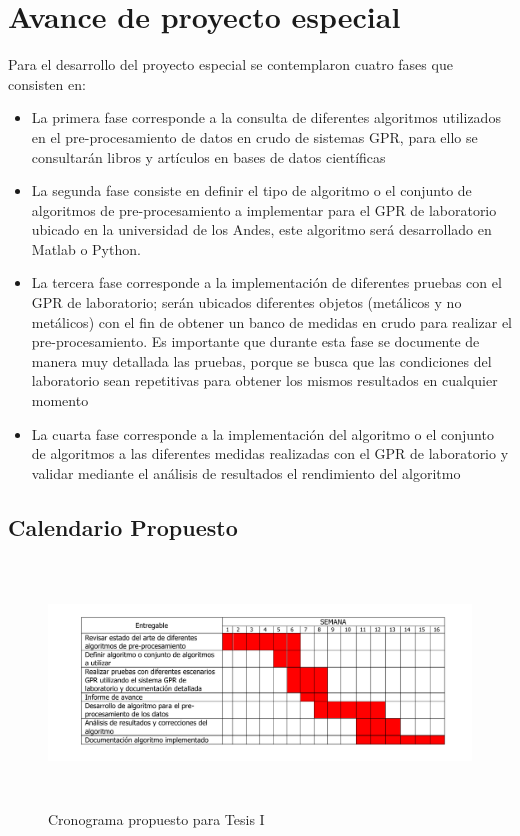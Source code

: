 \section{Avance de proyecto especial}

Para el desarrollo del proyecto especial se contemplaron cuatro fases que consisten en:

\begin{itemize}
\item La primera fase corresponde a la consulta de diferentes algoritmos utilizados en el pre-procesamiento de datos en crudo de sistemas GPR, para ello se consultarán libros y artículos en bases de datos científicas
\item La segunda fase consiste en definir el tipo de algoritmo o el conjunto de algoritmos de pre-procesamiento a implementar para el GPR de laboratorio ubicado en la universidad de los Andes, este algoritmo será desarrollado en Matlab o Python.
\item La tercera fase corresponde a la implementación de diferentes pruebas con el GPR de laboratorio; serán ubicados diferentes objetos (metálicos y no metálicos) con el fin de obtener un banco de medidas en crudo para realizar el pre-procesamiento. Es importante que durante esta fase se documente de manera muy detallada las pruebas, porque se busca que las condiciones del laboratorio sean repetitivas para obtener los mismos resultados en cualquier momento
\item La cuarta fase corresponde a la implementación del algoritmo o el conjunto de algoritmos a las diferentes medidas realizadas con el GPR de laboratorio y validar mediante el análisis de resultados el rendimiento del algoritmo
\end{itemize}

\subsection{Calendario Propuesto}

\begin{figure}[H]
\centering
\includegraphics[height=6.5cm,keepaspectratio]{chapter2/images/Calendario_ProyectoEspecial.pdf}

\caption{Cronograma propuesto para Tesis I }
\label{fig:ch1_cronograma_propuesto_tesis}
\end{figure}


